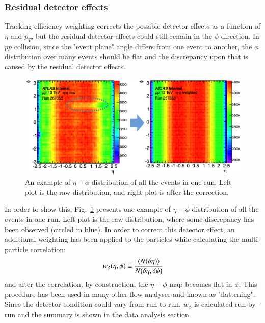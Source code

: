 \subsubsection{Residual detector effects}
Tracking efficiency weighting corrects the possible detector effects as a function of $\eta$ and $p_{T}$, but the residual detector effects could still remain in the $\phi$ direction. In $pp$ collision, since the "event plane" angle differs from one event to another, the $\phi$ distribution over many events should be flat and the discrepancy upon that is caused by the residual detector effects.

\begin{figure}[H]
\centering
\includegraphics[width=0.8\linewidth]{figs/sec_sys/pp13/sys_pp13_flat_eg.png}
\caption{An example of $\eta-\phi$ distribution of all the events in one run. Left plot is the raw distribution, and right plot is after the correction.}
\label{fig:sys_pp13_flat_eg}
\end{figure}
In order to show this, Fig.~\ref{fig:sys_pp13_flat_eg} presents one example of $\eta-\phi$ distribution of all the events in one run. Left plot is the raw distribution, where some discrepancy has been observed (circled in blue). In order to correct this detector effect, an additional weighting has been applied to the particles while calculating the multi-particle correlation:
\begin{equation}
w_{\phi}(\eta,\phi)\equiv \frac{\lr{N(\delta\eta)}}{N(\delta\eta,\delta\phi)}
\end{equation}
and after the correlation, by construction, the $\eta-\phi$ map becomes flat in $\phi$. This procedure has been used in many other flow analyses and known as "flattening". Since the detector condition could vary from run to run, $w_{\phi}$ is calculated run-by-run and the summary is shown in the data analysis section.

